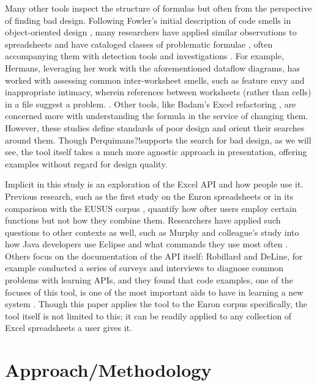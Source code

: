 \documentclass[conference]{IEEEtran}
\newcommand{\toolname}{Perquimans?!}
\begin{document}
	Many other tools inspect the structure of formulas but often from the
	perspective of finding bad design.  Following Fowler's initial description of
	code smells in object-oriented design \cite{fowler2009refactoring}, many
	researchers have applied similar observations to spreadsheets and have
	cataloged classes of problematic formulae \cite{hermans2012detecting}
	\cite{cunha2012towards} \cite{asavametha2012detecting}, often accompanying them
	with detection tools \cite{abreu2014smelling} and investigations \cite{jansen2015code}. For example, Hermans, leveraging her work with the aforementioned dataflow diagrams, has worked with assessing common inter-worksheet smells, such as feature envy and
	inappropriate intimacy, wherein references between worksheets (rather
	than cells) in a file suggest a problem. \cite{hermans2012detectinginter}. Other
	tools, like Badam's Excel refactoring \cite{badame2012refactoring}, are concerned
	more with understanding the formula in the service of changing them. 	
	However, these studies define standards of poor design and orient their searches
	around them. Though \toolname supports the search for bad design, as we will see, 
	the tool itself takes a much more agnostic approach in presentation, offering 
	examples without regard for design quality. \par
	
	Implicit in this study is an exploration of the Excel API and how people use
	it. Previous research, such as the first study on the Enron spreadsheets
	\cite{hermans2015enron} or in its comparison with the EUSUS corpus
	\cite{jansen2015enron}, quantify how ofter users employ certain functions but
	not how they combine them. Researchers have applied such questions to other
	contexts as well, such as Murphy and colleague's study into how Java developers
	use Eclipse and what commands they use most often \cite{murphy2006java}. 
	Others focus on the documentation of the API itself: Robillard and DeLine, for
	example conducted a series of surveys and interviews to diagnose common
	problems with learning APIs, and they found that code examples, one of the
	focuses of this tool, is one of the most important aids to have in learning a
	new system \cite{robillard2011field}. Though this paper applies the tool to the
	Enron corpus specifically, the tool itself is not limited to this; it can be 
	readily applied to any collection of Excel spreadsheets a user gives it.
	
	\section{Approach/Methodology} 
	
\end{document}
